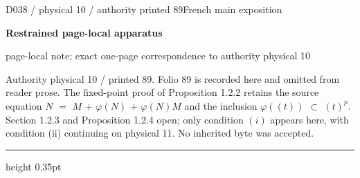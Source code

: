 \documentclass[9pt]{article}
\newcommand{\CanonText}[1]{\par{\fontsize{8.0}{9.35}\selectfont\RaggedRight #1\par}\vspace{2.2pt}}
\newcommand{\LayerTitle}{Restrained page-local apparatus}
\begin{document}
\noindent\begin{minipage}[t][\dimexpr\textheight-5pt\relax][t]{\textwidth}
{\sffamily\fontsize{7.3}{8.2}\selectfont\color{Quiet} D038 / physical 10 / authority printed 89\hfill French main exposition}
\par{}\vspace{4.5pt}
{\sffamily\fontsize{10.4}{11.6}\selectfont\bfseries\color{Accent} \LayerTitle}
\par{\sffamily\fontsize{6.7}{7.7}\selectfont\color{Quiet} page-local note; exact one-page correspondence to authority physical 10}
\vspace{5pt}
\CanonText{Authority physical 10 / printed 89. Folio 89 is recorded here and omitted from reader prose. The fixed-point proof of Proposition 1.2.2 retains the source equation \(N\) \(=\) \(M\) + \(\varphi{}(N)\) + \(\varphi{}(N)M\) and the inclusion \(\varphi{}((t))\) \(\subset{}\) \((t)^{p}\). Section 1.2.3 and Proposition 1.2.4 open; only condition \((i)\) appears here, with condition (ii) continuing on physical 11. No inherited byte was accepted.}
\vfill
{\color{Accent}\hrule height 0.35pt}\vspace{3pt}
\end{minipage}
\newpage
\end{document}
